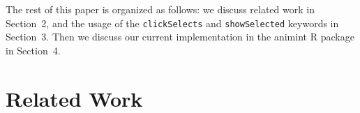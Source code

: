 \documentclass[journal]{vgtc}\usepackage[]{graphicx}\usepackage[]{color}
\begin{document}



The rest of this paper is organized as follows: we discuss related
work in Section~2, and the usage of the \texttt{clickSelects} and
\texttt{showSelected} keywords in Section~3. Then we discuss our
current implementation in the animint R package in Section~4.


\section{Related Work}
\end{document}
